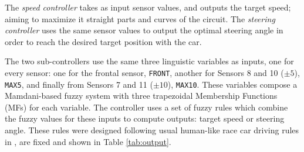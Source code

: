 \documentclass[10pt,journal,compsoc]{IEEEtran}
\begin{document}
The \textit{speed controller} takes as input sensor values, and
outputs the target speed; aiming to maximize it straight parts and curves of the circuit. The \textit{steering controller} uses the same sensor values to output the optimal steering angle in order to reach the desired target position with the car.

The two sub-controllers use the same three linguistic variables as
inputs, one for every sensor: one for the frontal sensor,
\texttt{FRONT}, another for Sensors 8 and 10 ($\pm 5$\textdegree),
\texttt{MAX5}, and finally from Sensors 7 and 11 ($\pm
10$\textdegree), \texttt{MAX10}. These variables compose a Mamdani-based fuzzy
system \cite{iancu2012} with three trapezoidal Membership Functions
(MFs) for each variable. The controller uses a set of fuzzy rules
which combine the fuzzy values for these inputs to compute outputs:
target speed or steering angle.
% 
These rules were designed following usual human-like race car driving
rules in \cite{salem_evo18}, are fixed and shown in Table \ref{tab:output}.
\end{document}
